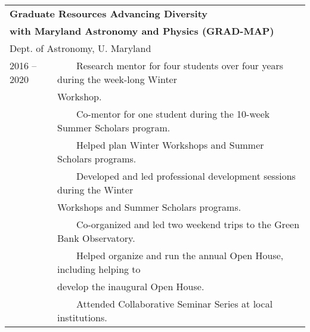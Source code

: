 \documentclass[11pt]{article}
\makeatletter
\newcommand{\tabitem}{~~\llap{\textbullet}~~}
\def\vhrulefill#1{\leavevmode\leaders\hrule\@height#1\hfill \kern\z@}
\makeatother
\begin{document}
\begin{longtable}{p{} p{}}
\multicolumn{2}{l}{\bf Graduate Resources Advancing Diversity} \vhrulefill{0.5pt}\\
\multicolumn{2}{l}{\bf with Maryland Astronomy and Physics (GRAD-MAP)}\\
\multicolumn{2}{l}{Dept. of Astronomy, U. Maryland} \smallskip \\
2016 -- 2020 & \tabitem Research mentor for four students over four years during the week-long Winter\\
& \hspace{13pt}Workshop.\\
& \tabitem Co-mentor for one student during the 10-week Summer Scholars program.\\
& \tabitem Helped plan Winter Workshops and Summer Scholars programs.\\
& \tabitem Developed and led professional development sessions during the Winter\\
& \hspace{13pt}Workshops and Summer Scholars programs.\\
& \tabitem Co-organized and led two weekend trips to the Green Bank Observatory.\\
& \tabitem Helped organize and run the annual Open House, including helping to\\
& \hspace{13pt}develop the inaugural Open House.\\
& \tabitem Attended Collaborative Seminar Series at local institutions.\medskip\\


\end{longtable}
\end{document}
